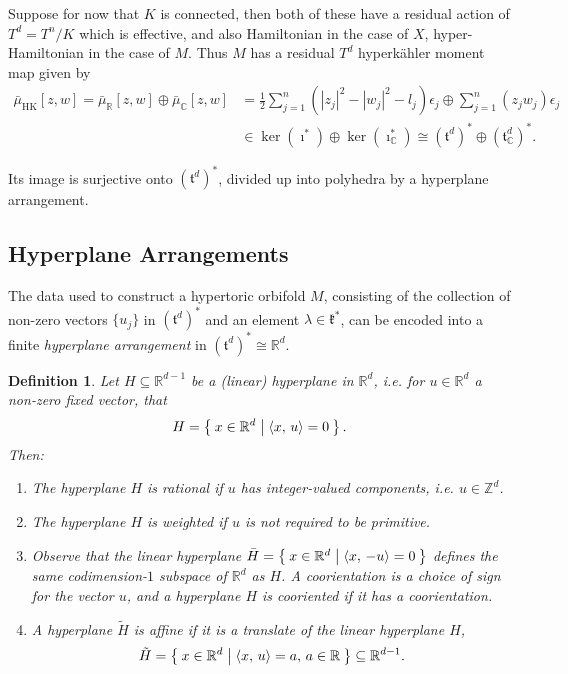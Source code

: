 \documentclass{amsart}
\newtheorem{defn}[theorem]{Definition\rm}
\newcommand{\ie}{\emph{i.e.} }
\newcommand{\e}{\epsilon}
\newcommand{\RR}{\mathbb{R}}
\newcommand{\CC}{\mathbb{C}}
\newcommand{\ZZ}{\mathbb{Z}}
\newcommand{\mfk}{\mathfrak{k}}
\newcommand{\mft}{\mathfrak{t}}
\newcommand{\half}{\frac{1}{2}}
\newcommand{\bmu}{\bar{\mu}}
\DeclareMathOperator{\HK}{HK}
\begin{document}
	Suppose for now that $K$ is connected, then both of these have a residual action of $T^{d} = T^{n}/K$ which is effective, and also Hamiltonian in the case of $X$, hyper-Hamiltonian in the case of $M$. Thus $M$ has a residual $T^{d}$ hyperk\"ahler moment map given by
	\begin{align}
		\bmu_{\HK}[z,w] = \bmu_{\RR}[z,w] \oplus \bmu_{\CC}[z,w] &= \half \sum_{j=1}^{n}(|z_{j}|^{2} - |w_{j}|^{2} - l_{j})\e_{j} \oplus \sum_{j=1}^{n}(z_{j}w_{j})\e_{j} \\
		&\in \ker(\imath^{\ast}) \oplus \ker(\imath_{\CC}^{\ast}) \cong (\mft^{d})^{\ast} \oplus (\mft_{\CC}^{d})^{\ast}.
	\end{align}

	Its image is surjective onto $(\mft^{d})^{\ast}$, divided up into polyhedra by a hyperplane arrangement.

	\subsection{Hyperplane Arrangements}
	
	The data used to construct a hypertoric orbifold $M$, consisting of the collection of non-zero vectors $\{u_{j}\}$ in $(\mft^{d})^{\ast}$ and an element $\lambda \in \mfk^{\ast}$, can be encoded into a finite \emph{hyperplane arrangement} in $(\mft^{d})^{\ast} \cong \RR^{d}$. 
	
	\begin{defn}
		Let $H \subseteq \RR^{d-1}$ be a (linear) hyperplane in $\RR^{d}$, \ie for $u \in \RR^{d}$ a non-zero fixed vector, that
		\[
			H = \Set{x \in \RR^{d} | \langle x,\, u \rangle = 0 }.
		\]
		Then:
		\begin{enumerate}
			\item[(rational) --] The hyperplane $H$ is \emph{rational} if $u$ has integer-valued components, \ie $u \in \ZZ^{d}$.
			\item[(weighted) --] The hyperplane $H$ is \emph{weighted} if $u$ is not required to be primitive.
			\item[(cooriented) --] Observe that the linear hyperplane $\bar{H} = \Set{ x \in \RR^{d} | \langle x,\, -u \rangle = 0}$ defines the same codimension-$1$ subspace of $\RR^{d}$ as $H$.  A \emph{coorientation} is a choice of sign for the vector $u$, and a hyperplane $H$ is \emph{cooriented} if it has a coorientation.
			\item[(affine) --] A hyperplane $\tilde{H}$ is \emph{affine} if it is a translate of the linear hyperplane $H$,
			\[
				\tilde{H} = \Set{x \in \RR^{d} | \langle x,\, u \rangle = a,\, a \in \RR} \subseteq \RR^{d-1}.	
			\]
		\end{enumerate}
	\end{defn}
\end{document}
